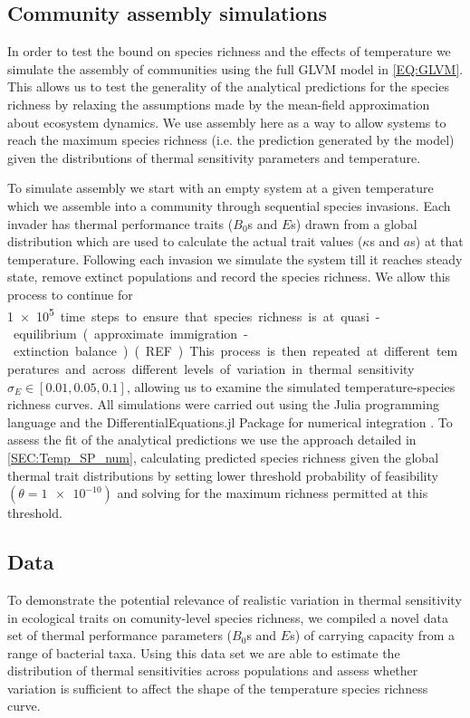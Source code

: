 \documentclass{article}
\begin{document}
\subsection*{Community assembly simulations}

In order to test the bound on species richness and the effects of temperature we simulate the assembly of communities using the full GLVM model in \cref{EQ:GLVM}. This allows us to test the generality of the analytical predictions for the species richness by relaxing the assumptions made by the mean-field approximation about ecosystem dynamics. We use assembly here as a way to allow systems to reach the maximum species richness (i.e. the prediction generated by the model) given the distributions of thermal sensitivity parameters and temperature. 

To simulate assembly we start with an empty system at a given temperature which we assemble into a community through sequential species invasions. Each invader has thermal performance traits ($B_0$s and $E$s) drawn from a global distribution which are used to calculate the actual trait values ($\kappa$s and $a$s) at that temperature. Following each invasion we simulate the system till it reaches steady state, remove extinct populations and record the species richness. We allow this process to continue for \SI{1e5} time steps to ensure that species richness is at quasi-equilibrium (approximate immigration-extinction balance) (REF). This process is then repeated at different temperatures and across different levels of variation in thermal sensitivity $\sigma_E \in [0.01, 0.05, 0.1]$, allowing us to examine the simulated temperature-species richness curves. All simulations were carried out using the Julia programming language and the DifferentialEquations.jl Package for numerical integration \citep{Rackauckas2017}. To assess the fit of the analytical predictions we use the approach detailed in \cref{SEC:Temp_SP_num}, calculating predicted species richness given the global thermal trait distributions by setting lower threshold probability of feasibility $(\theta = \SI{1e-10})$ and solving for the maximum richness permitted at this threshold.

\subsection*{Data}

To demonstrate the potential relevance of realistic  variation in thermal sensitivity in ecological traits on comunity-level species richness, we compiled a novel data set of thermal performance parameters ($B_0$s and $E$s) of carrying capacity from a range of bacterial taxa. Using this data set we are able to estimate the distribution of thermal sensitivities across populations and assess whether variation is sufficient to affect the shape of the temperature species richness curve. 
\end{document}
